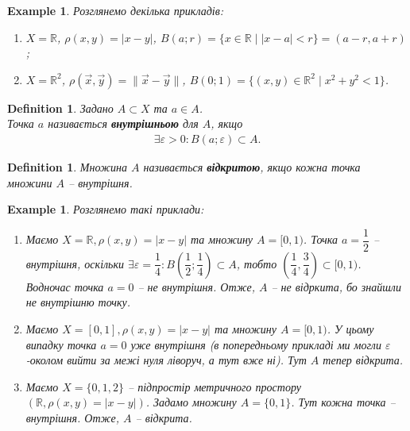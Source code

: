 \documentclass[a4paper, 10pt]{article}
\theoremstyle{theoremdd}
\theoremstyle{theoremdd}
\newtheorem{definition}[theorem]{Definition}
\theoremstyle{theoremdd}
\theoremstyle{theoremdd}
\newtheorem{example}[theorem]{Example}
\theoremstyle{theoremdd}
\theoremstyle{theoremdd}
\theoremstyle{theoremdd}
\theoremstyle{theoremdd}
\begin{document}
\begin{example}
Розглянемо декілька прикладів:
\begin{enumerate}[nosep,wide=0pt,label={\arabic*)}]
\item $X = \mathbb{R}$, $\rho(x,y) = |x-y|$, \qquad $B(a;r) = \{x \in \mathbb{R} \mid |x-a| < r\} = (a-r,a+r)$;
\item $X = \mathbb{R}^2$, $\rho(\vec{x}, \vec{y}) = \|\vec{x}-\vec{y}\|$, \qquad $B(0;1) = \{(x,y) \in \mathbb{R}^2 \mid x^2+y^2 <1 \}$.
\end{enumerate}
\end{example}

\begin{definition}
Задано $A \subset X$ та $a \in A$.\\
Точка $a$ називається \textbf{внутрішньою} для $A$, якщо
\begin{align*}
\exists \varepsilon > 0: B(a; \varepsilon) \subset A.
\end{align*}
\end{definition}

\begin{definition}
Множина $A$ називається \textbf{відкритою}, якщо кожна точка множини $A$ -- внутрішня.
\end{definition}

\begin{example} 
Розглянемо такі приклади:
\begin{enumerate}[wide=0pt,label={\arabic*)}]
\item Маємо $X = \mathbb{R}, \rho(x,y) = |x-y|$ та множину $A = [0,1)$. Точка $a = \dfrac{1}{2}$ -- внутрішня, оскільки $\exists \varepsilon = \dfrac{1}{4}: B\left(\dfrac{1}{2}; \dfrac{1}{4} \right) \subset A$, тобто $\left( \dfrac{1}{4}, \dfrac{3}{4} \right) \subset [0,1)$. Водночас точка $a = 0$ -- не внутрішня. Отже, $A$ -- не відркита, бо знайшли не внутрішню точку.

\item Маємо $X = [0,1], \rho(x,y) = |x-y|$ та множину $A = [0,1)$. У цьому випадку точка $a = 0$ уже внутрішня (в попередньому прикладі ми могли $\varepsilon$-околом вийти за межі нуля ліворуч, а тут вже ні). Тут $A$ тепер відкрита.

\item Маємо $X = \{0,1,2\}$ -- підпростір метричного простору $(\mathbb{R}, \rho(x,y) = |x-y|)$. Задамо множину $A = \{0,1\}$. Тут кожна точка -- внутрішня. Отже, $A$ -- відкрита.
\end{enumerate}
\end{example}
\end{document}
